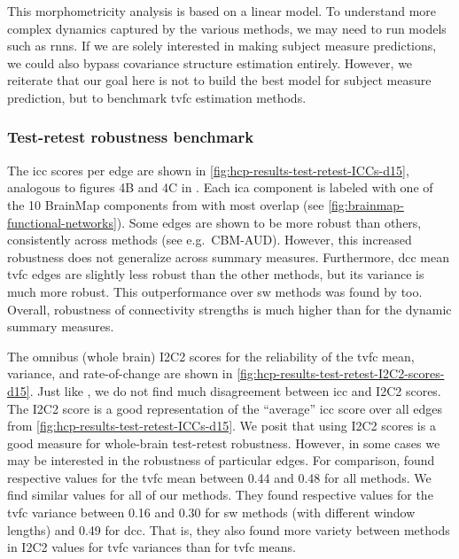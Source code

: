 This morphometricity analysis is based on a linear model.
To understand more complex dynamics captured by the various methods, we may need to run models such as \glspl{rnn}.
If we are solely interested in making subject measure predictions, we could also bypass covariance structure estimation entirely.
However, we reiterate that our goal here is not to build the best model for subject measure prediction, but to benchmark \gls{tvfc} estimation methods.

\subsubsection{Test-retest robustness benchmark}

The \gls{icc} scores per edge are shown in \cref{fig:hcp-results-test-retest-ICCs-d15}, analogous to figures 4B and 4C in \textcite{Choe2017}.
Each \gls{ica} component is labeled with one of the 10 BrainMap components from \textcite{Smith2009} with most overlap (see \cref{fig:brainmap-functional-networks}).
%
Some edges are shown to be more robust than others, consistently across methods (see e.g.~CBM-AUD).
However, this increased robustness does not generalize across summary measures.
Furthermore, \gls{dcc} mean \gls{tvfc} edges are slightly less robust than the other methods, but its variance is much more robust.
This outperformance over \gls{sw} methods was found by \textcite{Choe2017} too.
Overall, robustness of connectivity strengths is much higher than for the dynamic summary measures.

The omnibus (whole brain) I2C2 scores for the reliability of the \gls{tvfc} mean, variance, and rate-of-change are shown in \cref{fig:hcp-results-test-retest-I2C2-scores-d15}.
Just like \textcite{Choe2017}, we do not find much disagreement between \gls{icc} and I2C2 scores.
The I2C2 score is a good representation of the ``average'' \gls{icc} score over all edges from \cref{fig:hcp-results-test-retest-ICCs-d15}.
We posit that using I2C2 scores is a good measure for whole-brain test-retest robustness.
However, in some cases we may be interested in the robustness of particular edges.
For comparison, \textcite{Choe2017} found respective values for the \gls{tvfc} mean between 0.44 and 0.48 for all methods.
We find similar values for all of our methods.
They found respective values for the \gls{tvfc} variance between 0.16 and 0.30 for \gls{sw} methods (with different window lengths) and 0.49 for \gls{dcc}.
That is, they also found more variety between methods in I2C2 values for \gls{tvfc} variances than for \gls{tvfc} means.


